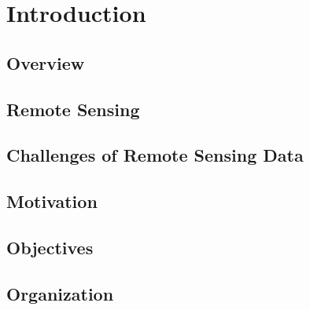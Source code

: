 \documentclass[document.tex]{subfiles}
\begin{document}
\chapter{Introduction}

\section{Overview}

\section{Remote Sensing}

\section{Challenges of Remote Sensing Data}

\section{Motivation}

\section{Objectives}

\section{Organization}
\end{document}
